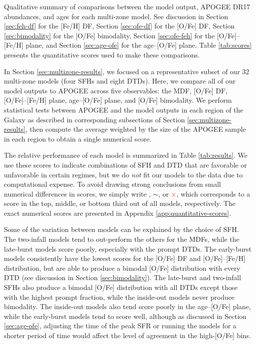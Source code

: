 \documentclass[twocolumn,twocolappendix]{aastex631}
\newcommand{\yes}{\textcolor{green}{\checkmark}\xspace}
\newcommand{\meh}{\textcolor{black}{$\sim$}\xspace}
\newcommand{\no}{\textcolor{red}{$\times$}\xspace}
\begin{document}
\begin{table*}
\centering
\caption{Qualitative summary of comparisons between the model output,
APOGEE DR17 abundances, and  ages for each multi-zone
model. See discussion in Section \ref{sec:feh-df} for the [Fe/H] DF, 
Section \ref{sec:ofe-df} for the [O/Fe] DF, Section \ref{sec:bimodality} for
the [O/Fe] bimodality, Section \ref{sec:ofe-feh} for the [O/Fe]--[Fe/H] plane,
and Section \ref{sec:age-ofe} for the age--[O/Fe] plane. Table \ref{tab:scores}
presents the quantitative scores used to make these comparisons.}
\label{tab:results}
\end{table*}

In Section \ref{sec:multizone-results}, we focused on a representative subset of our 32 multi-zone models (four SFHs and eight DTDs). Here, we compare all of our model outputs to APOGEE across five observables: the MDF, [O/Fe] DF, [O/Fe]--[Fe/H] plane, age--[O/Fe] plane, and [O/Fe] bimodality. We perform statistical tests between APOGEE and the model outputs in each region of the Galaxy as described in corresponding subsections of Section \ref{sec:multizone-results}, then compute the average weighted by the size of the APOGEE sample in each region to obtain a single numerical score.

The relative performance of each model is summarized in Table \ref{tab:results}. We use these scores to indicate combinations of SFH and DTD that are favorable or unfavorable in certain regimes, but we do {\it not} fit our models to the data due to computational expense. To avoid drawing strong conclusions from small numerical differences in scores, we simply write \yes, \meh, or \no, which corresponds to a score in the top, middle, or bottom third out of all models, respectively. The exact numerical scores are presented in Appendix \ref{app:quantitative-scores}.

Some of the variation between models can be explained by the choice of SFH. The two-infall models tend to out-perform the others for the MDFs, while the late-burst models score poorly, especially with the prompt DTDs. The early-burst models consistently have the lowest scores for the [O/Fe] DF and [O/Fe]--[Fe/H] distribution, but are able to produce a bimodal [O/Fe] distribution with every DTD (see discussion in Section \ref{sec:bimodality}). The late-burst and two-infall SFHs also produce a bimodal [O/Fe] distribution with all DTDs except those with the highest prompt fraction, while the inside-out models never produce bimodality. The inside-out models also tend score poorly in the age--[O/Fe] plane, while the early-burst models tend to score well, although as discussed in Section \ref{sec:age-ofe}, adjusting the time of the peak SFR or running the models for a shorter period of time would affect the level of agreement in the high-[O/Fe] bins.
\end{document}
